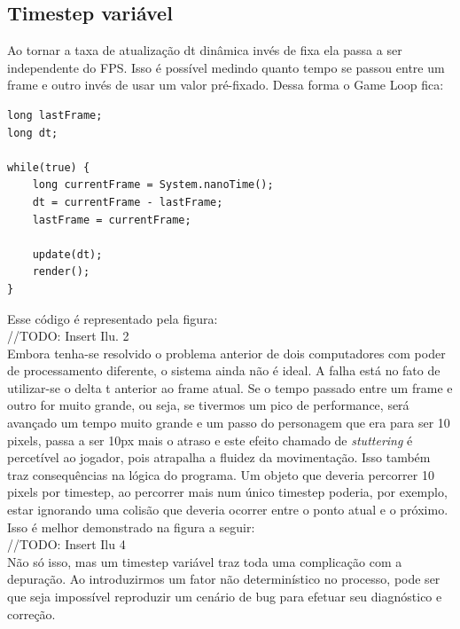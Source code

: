 \documentclass[12pt, 
openright, 
oneside, 
a4paper,    
brazil]{facom-ufu-abntex2}
\begin{document}
\subsection{Timestep variável}
Ao tornar a taxa de atualização dt dinâmica invés de fixa ela passa a ser independente do FPS. Isso é possível medindo quanto tempo se passou entre um frame e outro invés de usar um valor pré-fixado. Dessa forma o Game Loop fica:\\
\begin{lstlisting}[caption=Game Loop com timestep variável]
long lastFrame;
long dt;
		
while(true) {
	long currentFrame = System.nanoTime(); 
	dt = currentFrame - lastFrame;
	lastFrame = currentFrame;
	
	update(dt);
	render();
}
\end{lstlisting}
Esse código é representado pela figura:
\\//TODO: Insert Ilu. 2\\
Embora tenha-se resolvido o problema anterior de dois computadores com poder de processamento diferente, o sistema ainda não é ideal. A falha está no fato de utilizar-se o delta t anterior ao frame atual. Se o tempo passado entre um frame e outro for muito grande, ou seja, se tivermos um pico de performance, será avançado um tempo muito grande e um passo do personagem que era para ser 10 pixels, passa a ser 10px mais o atraso e este efeito chamado de \textit{stuttering} é percetível ao jogador, pois atrapalha a fluidez da movimentação. Isso também traz consequências na lógica do programa. Um objeto que deveria percorrer 10 pixels por timestep, ao percorrer mais num único timestep poderia, por exemplo, estar ignorando uma colisão que deveria ocorrer entre o ponto atual e o próximo. Isso é melhor demonstrado na figura a seguir:
\\//TODO: Insert Ilu 4
\\ Não só isso, mas um timestep variável traz toda uma complicação com a depuração. Ao introduzirmos um fator não determinístico no processo, pode ser que seja impossível reproduzir um cenário de bug para efetuar seu diagnóstico e correção. 
\end{document}
